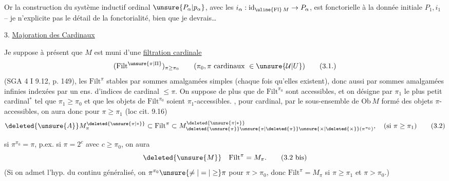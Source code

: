 Or la construction  du système inductif ordinal $\unsure{P_\alpha|p_\alpha}$, avec les $i_\alpha:\mathrm{id}_{\uline{\mathrm{Fl}}\,M}\to P_\alpha$, est fonctorielle  à la donnée initiale $P_1,i_1$ -- je  n'explicite pas le détail de la fonctorialité, bien que je devrais\ldots

3. \uline{Majoration des Cardinaux}

Je suppose à présent que $M$ est muni d'une \uline{filtration cardinale}
\[
(\mathrm{Filt}^{\unsure{\pi|\Pi}})_{\pi\geq\pi_0}\qquad(\pi_0,\pi\text{ cardinaux }\in\unsure{\mathcal U|U})\tag*{(3.1.)}
\]
(SGA 4 I 9.12, p. 149),  les $\mathrm{Filt}^{\pi}$ stables par sommes amalgamées simples (chaque fois qu'elles existent), donc aussi par sommes amalgamées infinies indexées par un ens. d'indices de cardinal $\leq\pi$. On suppose de plus que   de $\mathrm{Filt}^{\pi_0}$ sont accessibles, et  on désigne par \textcircled{$\pi_1$} le plus petit cardinal$^*$ tel que $\pi_1\geq\pi_0$ et que les objets de $\mathrm{Filt}^{\pi_0}$ soient $\pi_1$-accessibles. , pour \deleted{$\unsure{\pi}$}  cardinal, par   le sous-ensemble de $\mathrm{Ob}\,M$ formé des objets $\pi$-accessibles, on aura donc pour  $\pi\geq\pi_1$ (loc cit. 9.16)
\[
\deleted{\unsure{A}}M_{\pi}^{\deleted{\unsure{\pi|*}}}\subset\mathrm{Filt}^{\pi}\subset M_{\deleted{\unsure{\pi}}\unsure{\pi|\deleted{\pi}}\unsure{\times|\deleted{\times}}(\pi^{\pi_0})}^{\deleted{\unsure{\pi|*}}},\quad(\text{si }\pi\geq\pi_1)\tag*{(3.2)}
\]

 si $\pi^{\pi_0}=\pi$, p.ex. si $\pi=2^c$ avec $c\geq\pi_0$, on aura
\[
\deleted{\unsure{M}}\quad\mathrm{Filt}^{\pi}=M_\pi.\tag*{(3.2 bis)}
\]
(Si on admet l'hyp. du continu généralisé, on  $\pi^{\pi_0}\unsure{\ne|=|\geq}\pi$ pour  $\pi>\pi_0$, donc $\mathrm{Filt}^{\pi}=M_\pi$ si $\pi\geq\pi_1$ et $\pi>\pi_0$.)


